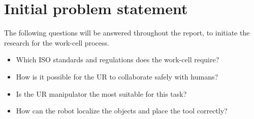 \section{Initial problem statement}\label{ch:Initial problem statment}


The following questions will be answered throughout the report, to initiate the research for the work-cell process.

\begin{itemize}
    \item Which ISO standards and regulations does the work-cell require?
    \item How is it possible for the UR to collaborate safely with humans?
    \item Is the UR manipulator the most suitable for this task?
    \item How can the robot localize the objects and place the tool correctly?
\end{itemize}